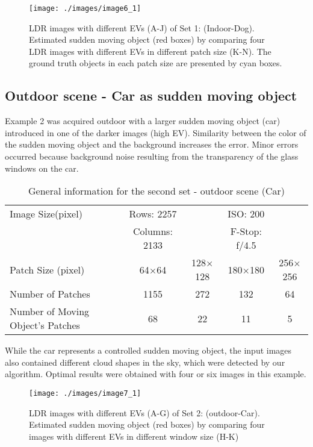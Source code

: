 \documentclass[preprint,12pt,3p]{elsarticle}
\begin{document}
\begin{figure}[hp]
\centering
\texttt{[image: ./images/image6\_1]}
\caption{LDR images with different EVs (A-J) of Set 1: (Indoor-Dog). Estimated sudden moving object (red boxes) by comparing four LDR images with different EVs in different patch size (K-N). The ground truth objects in each patch size are presented by cyan boxes.}
\label{fig:image6_1}
\end{figure}

\subsection{Outdoor scene - Car as sudden moving object}
Example 2 was acquired outdoor with a larger sudden moving object (car) introduced in one of the darker images (high EV). Similarity between the color of the sudden moving object and the background increases the error. Minor errors occurred because background noise resulting from the transparency of the glass windows on the car.

\begin{table}[h]
  \centering
  \caption{General information for the second set - outdoor scene (Car)}
    \begin{tabular}{l|cccc}
    \hline
    Image Size(pixel) & Rows: 2257 & & ISO: 200  \\
          & Columns: 2133 &  & F-Stop: f/4.5  \\
                  \hline
    Patch Size (pixel) & \multicolumn{1}{c}{64$\times$64} & \multicolumn{1}{c}{128$\times$128} & \multicolumn{1}{c}{180$\times$180} & \multicolumn{1}{c}{256$\times$256} \\
        \hline
    Number of Patches & \multicolumn{1}{c}{1155} & \multicolumn{1}{c}{272} & \multicolumn{1}{c}{132} & \multicolumn{1}{c}{64} \\
    Number of Moving Object's Patches & \multicolumn{1}{c}{68} & \multicolumn{1}{c}{22} & \multicolumn{1}{c}{11} & \multicolumn{1}{c}{5} \\

    \end{tabular}%
  \label{tab:set2}%
\end{table}%

 While the car represents a controlled sudden moving object, the input images also contained different cloud shapes in the sky, which were detected by our algorithm. Optimal results were obtained with four or six images in this example. 

\begin{figure}[hp]
\centering
\texttt{[image: ./images/image7\_1]}
\caption{LDR images with different EVs (A-G) of Set 2: (outdoor-Car). Estimated sudden moving object (red boxes) by comparing four images with different EVs in different window size (H-K)}
\label{fig:image7_1}
\end{figure}
\end{document}
